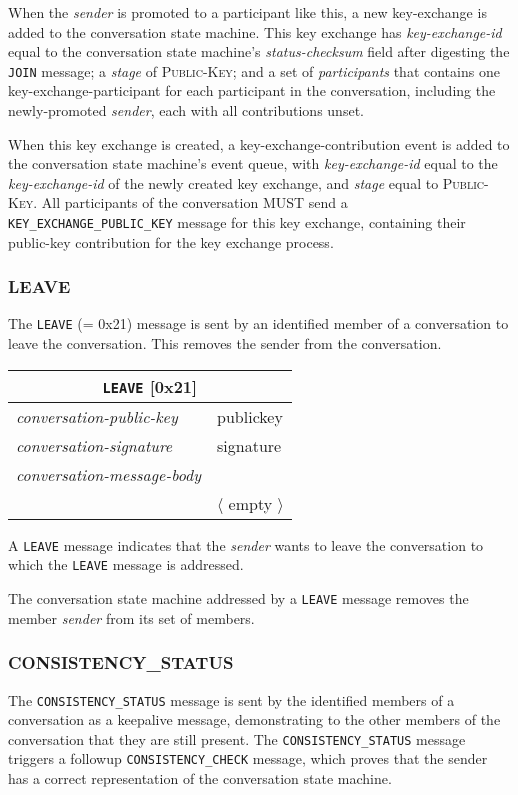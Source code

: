 \documentclass{article}
\def\npmessage#1{\texttt{#1}}
\def\field#1{\textit{#1}}
\def\smfield#1{\textsl{#1}}
\def\type#1{\textsf{#1}}
\newenvironment{conversationmessage}[2]{
\newcommand{\messagefield}[2]{
& \field{##1} & \type{##2} \\
\hline
}
\hspace{2em minus 2em}\begin{tabular}{|l|l|l|}
\hline
\multicolumn{3}{|c|}{\npmessage{#1} [#2]} \\
\hline
\hline
\field{conversation-public-key} & \multicolumn{2}{l|}{\type{publickey}} \\
\hline
\field{conversation-signature} & \multicolumn{2}{l|}{\type{signature}} \\
\hline
\field{conversation-message-body} & \multicolumn{2}{l|}{} \\
\hline
}{
\end{tabular}
}
\newcommand\emptyconversationmessage[2]{
\begin{conversationmessage}{#1}{#2}
& \multicolumn{2}{|l|}{ $\langle$ empty $\rangle$ } \\
\hline
\end{conversationmessage}
}
\begin{document}
When the \field{sender} is promoted to a participant like this, a new \type{key-exchange} is added to the conversation state machine.
This key exchange has \smfield{key-exchange-id} equal to the conversation state machine's \smfield{status-checksum} field after digesting the \npmessage{JOIN} message; a \smfield{stage} of \textsc{Public-Key}; and a set of \smfield{participants} that contains one \type{key-exchange-participant} for each participant in the conversation, including the newly-promoted \field{sender}, each with all contributions unset.

When this key exchange is created, a \type{key-exchange-contribution} event is added to the conversation state machine's event queue, with \smfield{key-exchange-id} equal to the \smfield{key-exchange-id} of the newly created key exchange, and \smfield{stage} equal to \textsc{Public-Key}.
All participants of the conversation MUST send a \npmessage{KEY\_EXCHANGE\_PUBLIC\_KEY} message for this key exchange, containing their public-key contribution for the key exchange process.


\subsubsection{LEAVE}
\label{sec:messages/leave}

The \npmessage{LEAVE} (= 0x21) message is sent by an identified member of a conversation to leave the conversation.
This removes the sender from the conversation.

\emptyconversationmessage{LEAVE}{0x21}

A \npmessage{LEAVE} message indicates that the \field{sender} wants to leave the conversation to which the \npmessage{LEAVE} message is addressed.

The conversation state machine addressed by a \npmessage{LEAVE} message removes the member \field{sender} from its set of members.


\subsubsection{CONSISTENCY\_STATUS}
\label{sec:messages/consistency-status}

The \npmessage{CONSISTENCY\_STATUS} message is sent by the identified members of a conversation as a keepalive message, demonstrating to the other members of the conversation that they are still present.
The \npmessage{CONSISTENCY\_STATUS} message triggers a followup \npmessage{CONSISTENCY\_CHECK} message, which proves that the sender has a correct representation of the conversation state machine.
\end{document}
